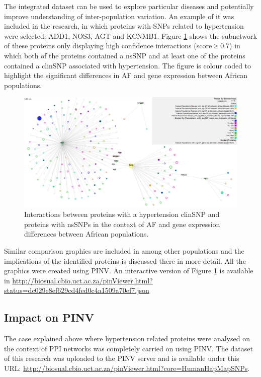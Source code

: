 The integrated dataset can be used to explore particular diseases and potentially improve understanding of inter-population variation. An example of it was included in the research, in which proteins with SNPs related to hypertension were selected: ADD1, NOS3, AGT and KCNMB1. Figure \ref{fig:pinv_human_snps} shows the subnetwork of these proteins only displaying high confidence interactions (score ≥ 0.7) in which both of the proteins contained a nsSNP and at least one of the proteins contained a clinSNP associated with hypertension. The figure is colour coded to highlight the significant differences in AF and gene expression between African populations. 

\begin{figure}
\centering
\includegraphics[width=\textwidth]{figures/pinv_human_snps.png}
\caption[Interactions between proteins with a hypertension clinSNP]{Interactions between proteins with a hypertension clinSNP and proteins with nsSNPs in the context of AF and gene expression differences between African populations.
\label{fig:pinv_human_snps}}
\end{figure}

Similar comparison graphics are included in \cite{HEE2014} among other populations and the implications of the identified proteins is discussed there in more detail. All the graphics were created using PINV. An interactive version of Figure \ref{fig:pinv_human_snps} is available in \url{http://biosual.cbio.uct.ac.za/pinViewer.html?status=dc029e8ef629cd4fed0c4a1509a70ef7.json}

\subsection{Impact on PINV}
The case explained above where hypertension related proteins were analysed on the context of PPI networks was completely carried on using PINV. The dataset of this research was uploaded to the PINV server and is available under this URL: \url{http://biosual.cbio.uct.ac.za/pinViewer.html?core=HumanHapMapSNPs}. 

